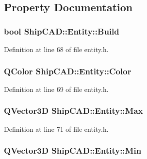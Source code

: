 \subsection{Property Documentation}
\hypertarget{classShipCAD_1_1Entity_a7518cde7c6a7c576827efd3d65c732e4}{
\subsubsection[{Build}]{\setlength{\rightskip}{0pt plus 5cm}bool Ship\-C\-A\-D\-::\-Entity\-::\-Build\hspace{0.3cm}{\ttfamily [read]}}}\label{classShipCAD_1_1Entity_a7518cde7c6a7c576827efd3d65c732e4}


Definition at line 68 of file entity.\-h.

\hypertarget{classShipCAD_1_1Entity_a117b8362d17e9ef352555a85a6f015ff}{
\subsubsection[{Color}]{\setlength{\rightskip}{0pt plus 5cm}Q\-Color Ship\-C\-A\-D\-::\-Entity\-::\-Color}}\label{classShipCAD_1_1Entity_a117b8362d17e9ef352555a85a6f015ff}


Definition at line 69 of file entity.\-h.

\hypertarget{classShipCAD_1_1Entity_a1ce317d1da352757209465baebce15f8}{
\subsubsection[{Max}]{\setlength{\rightskip}{0pt plus 5cm}Q\-Vector3\-D Ship\-C\-A\-D\-::\-Entity\-::\-Max\hspace{0.3cm}{\ttfamily [read]}}}\label{classShipCAD_1_1Entity_a1ce317d1da352757209465baebce15f8}


Definition at line 71 of file entity.\-h.

\hypertarget{classShipCAD_1_1Entity_ac363c3a8e4d5553b98996d6114b6b148}{
\subsubsection[{Min}]{\setlength{\rightskip}{0pt plus 5cm}Q\-Vector3\-D Ship\-C\-A\-D\-::\-Entity\-::\-Min\hspace{0.3cm}{\ttfamily [read]}}}\label{classShipCAD_1_1Entity_ac363c3a8e4d5553b98996d6114b6b148}


